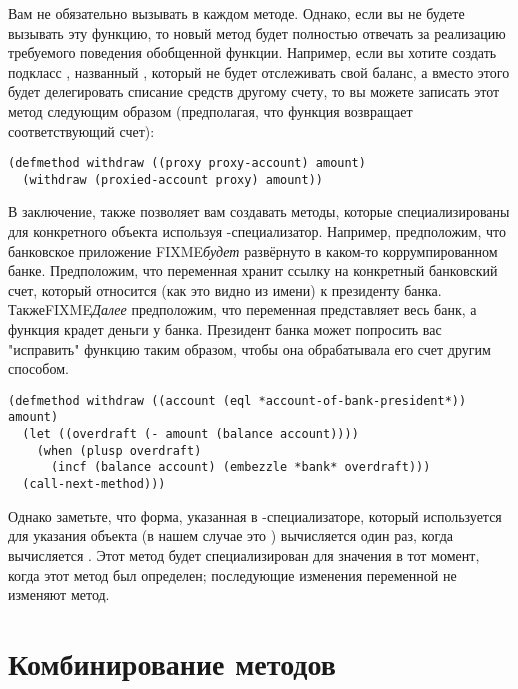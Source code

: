 Вам не обязательно вызывать  в каждом методе.  Однако, если вы не
будете вызывать эту функцию, то новый метод будет полностью отвечать за реализацию
требуемого поведения обобщенной функции.  Например, если вы хотите создать подкласс
, названный , который не будет отслеживать свой
баланс, а вместо этого будет делегировать списание средств другому счету, то вы можете
записать этот метод следующим образом (предполагая, что функция 
возвращает соответствующий счет):

\begin{lstlisting}
(defmethod withdraw ((proxy proxy-account) amount)
  (withdraw (proxied-account proxy) amount))
\end{lstlisting}

В заключение,  также позволяет вам создавать методы, которые
специализированы для конкретного объекта используя -специализатор.  Например,
предположим, что банковское приложение FIXME\textit{будет} развёрнуто в каком-то
коррумпированном банке.  Предположим, что переменная 
хранит ссылку на конкретный банковский счет, который относится (как это видно из имени) к
президенту банка.  ТакжеFIXME\textit{Далее} предположим, что переменная 
представляет весь банк, а функция  крадет деньги у банка.  Президент банка
может попросить вас "исправить" функцию  таким образом, чтобы она
обрабатывала его счет другим способом.

\begin{lstlisting}
(defmethod withdraw ((account (eql *account-of-bank-president*)) amount)
  (let ((overdraft (- amount (balance account))))
    (when (plusp overdraft)
      (incf (balance account) (embezzle *bank* overdraft)))
  (call-next-method)))
\end{lstlisting}

Однако заметьте, что форма, указанная в -специализаторе, который используется
для указания объекта (в нашем случае это ) вычисляется
один раз, когда вычисляется .  Этот метод будет специализирован для
значения  в тот момент, когда этот метод был определен;
последующие изменения переменной не изменяют метод.

\section{Комбинирование методов}

